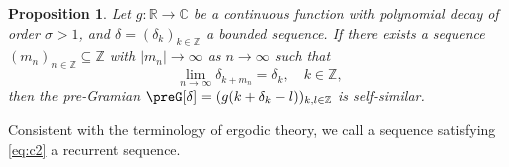 \documentclass[reqno,a4paper,12pt]{amsart}
\numberwithin{equation}{section}
\newtheorem{proposition}[definition]{Proposition}
\def\Z{{\mathbb Z}}
\def\R{{\mathbb R}}
\def\C{{\mathbb C}}
\newcommand\1{\mathds{1}}
\begin{document}
\begin{proposition}
\label{thm:preG_selfsim}
    Let $g:\R\to\C$ be a continuous function with polynomial decay of order $\sigma>1$, and $\delta=(\delta_k)_{k\in\Z}$ a bounded sequence.
    If there exists a sequence  $(m_n)_{n\in\Z} \subseteq \Z$ with $|m_n|\to\infty$ as $n\to\infty$ such that 
    \begin{equation} \label{eq:c2} 
        \lim\limits_{n\to\infty} \delta_{k+m_n}=\delta_k,\quad k\in\Z,
    \end{equation}
    then the pre-Gramian
    $\preG[\delta]=(g(k+\delta_k-l))_{k,l\in\Z}$ is self-similar. 
\end{proposition}
Consistent with the terminology of ergodic theory, we call a sequence
satisfying \eqref{eq:c2} a recurrent sequence. 
\end{document}
